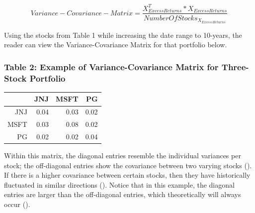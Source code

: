 \documentclass[12pt,english]{article}
\begin{document}
                    \begin{singlespace}
                        \begin{center}
                            \begin{equation} \label{Variance-Covariance-Matrix}
                                Variance-Covariance-Matrix = 
                                \frac{X^{T}_{Excess Returns} * X_{Excess Returns}}
                                {Number Of Stocks_{X_{Excess Returns}}} 
                            \end{equation}
                        \end{center}
                    \end{singlespace}
                \begin{doublespace}
            
            \indent{}\indent{}
        	Using the stocks from Table 1 while increasing the date range to 10-years, the reader can view the Variance-Covariance Matrix for that portfolio below. 
            
                \subsubsection{Table 2: Example of Variance-Covariance Matrix for Three-Stock Portfolio} 
                        \begin{table}[ht]
                        \centering
                        \begin{tabular}{rrrr}
                          \hline
                         & JNJ & MSFT & PG \\ 
                          \hline
                        JNJ & 0.04 & 0.03 & 0.02 \\ 
                          MSFT & 0.03 & 0.08 & 0.02 \\ 
                          PG & 0.02 & 0.02 & 0.04 \\ 
                           \hline
                        \end{tabular}
                        \end{table}
                    
                \indent{}
            	Within this matrix, the diagonal entries resemble the individual variances per stock; the off-diagonal entries show the covariance between two varying stocks (\citet{Simon2008}). If there is a higher covariance between certain stocks, then they have historically fluctuated in similar directions (\citet{Simon2008}). Notice that in this example, the diagonal entries are larger than the off-diagonal entries, which theoretically will always occur (\citet{Simon2008}). 


\end{doublespace}
\end{document}
